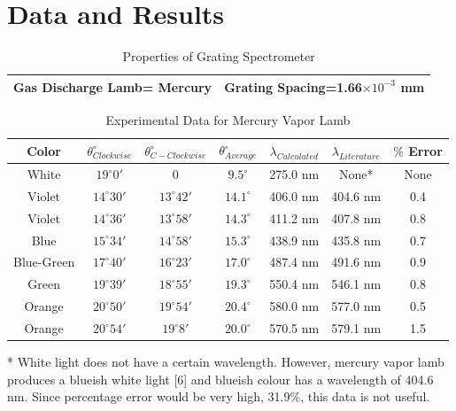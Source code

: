 \documentclass[a4paper,12pt]{report}
\begin{document}
\chapter{Data and Results}
\begin{table}[h]
	\begin{center}
\begin{tabular}{|c|c|}
	\hline Gas Discharge Lamb=  Mercury & Grating Spacing=1.66$\times10^{-3}$ mm \\ 
	\hline 
\end{tabular}
\end{center}
\caption{Properties of Grating Spectrometer}
\end{table} 
\begin{table}[h]
	\begin{center}
\begin{tabular}{|c|c|c|c|c|c|c|}
	\hline Color & $\theta^{\circ}_{Clockwise}$ & $\theta^{\circ}_{C-Clockwise}$ & $\theta^{\circ}_{Average}$ & $\lambda_{Calculated}$ & $\lambda_{Literature}$ & $\%$ Error\\  
	\hline White & $19^{\circ}$$0'$ & 0 & $9.5^{\circ}$ & 275.0 nm & None* & None \\ 
	\hline Violet & $14^{\circ}$$30'$ & $13^{\circ}$$42'$ & $14.1^{\circ}$ & 406.0 nm & 404.6 nm & 0.4 \\ 
	\hline Violet & $14^{\circ}$$36'$ & $13^{\circ}$$58'$ & $14.3^{\circ}$ & 411.2 nm & 407.8 nm & 0.8 \\ 
	\hline Blue & $15^{\circ}$$34'$ & $14^{\circ}$$58'$ & $15.3^{\circ}$ & 438.9 nm & 435.8 nm & 0.7 \\ 
	\hline Blue-Green & $17^{\circ}$$40'$ & $16^{\circ}$$23'$ & $17.0^{\circ}$ & 487.4 nm & 491.6 nm & 0.9 \\ 
	\hline Green & $19^{\circ}$$39'$ & $18^{\circ}$$55'$ & $19.3^{\circ}$ & 550.4 nm & 546.1 nm & 0.8 \\ 
	\hline Orange & $20^{\circ}$$50'$ & $19^{\circ}$$54'$ & $20.4^{\circ}$ & 580.0 nm & 577.0 nm & 0.5 \\ 
	\hline Orange & $20^{\circ}$$54'$ & $19^{\circ}$$8'$ & $20.0^{\circ}$ & 570.5 nm & 579.1 nm & 1.5 \\ 
	\hline 
\end{tabular} 
\end{center}
\caption{Experimental Data for Mercury Vapor Lamb}
\end{table} 
* White light does not have a certain wavelength. However, mercury vapor lamb produces a blueish white light [6] and blueish colour has a wavelength of 404.6 nm. Since percentage error would be very high, 31.9\%, this data is not useful.\\\\
\end{document}
